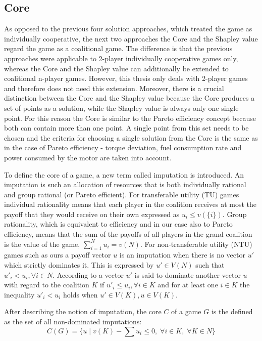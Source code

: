 \subsection{Core}
As opposed to the previous four solution approaches, which treated the game as individually cooperative, the next two approaches the Core and the Shapley value regard the game as a coalitional game. The difference is that the previous approaches were applicable to 2-player individually cooperative games only, whereas the Core and the Shapley value can additionally be extended to coalitional n-player games. However, this thesis only deals with 2-player games and therefore does not need this extension. Moreover, there is a crucial distinction between the Core and the Shapley value because the Core produces a set of points as a solution, while the Shapley value is always only one single point. For this reason the Core is similar to the Pareto efficiency concept because both can contain more than one point. A single point from this set needs to be chosen and the criteria for choosing a single solution from the Core is the same as in the case of Pareto efficiency - torque deviation, fuel consumption rate and power consumed by the motor are taken into account.

To define the core of a game, a new term called imputation is introduced. An imputation is such an allocation of resources that is both individually rational and group rational (or Pareto efficient). For transferable utility (TU) games individual rationality means that each player in the coalition receives at most the payoff that they would receive on their own expressed as $u_i \leq v(\{i\})$. Group rationality, which is equivalent to efficiency and in our case also to Pareto efficiency, means that the sum of the payoffs of all players in the grand coalition is the value of the game, $\sum_{i=1}^{N} u_i = v(N)$. For non-transferable utility (NTU) games such as ours a payoff vector $u$ is an imputation when there is no vector $u'$ which strictly dominates it. This is expressed by $u' \in V(N)$ such that $u'_i < u_i, \forall i\in N$. According to \citet{holler2006einfuhrung} a vector $u'$ is said to dominate another vector $u$ with regard to the coalition $K$ if $u'_i \leq u_i, \forall i \in K$ and for at least one $i \in K$ the inequality $u'_i < u_i$ holds when $u' \in V(K), u \in V(K)$.

After describing the notion of imputation, the core $C$ of a game $G$ is the defined as the set of all non-dominated imputations:
\begin{equation}
C(G) = \{u \;|\; v(K) - \sum u_i \leq 0, \; \forall i \in K, \; \forall K \in N \}
\end{equation}


